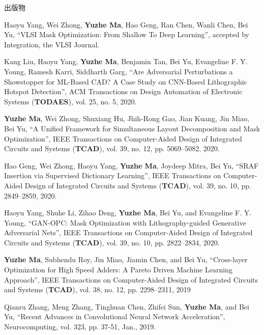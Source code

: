 \begin{rSection}{出版物}
\begin{description}[font=\normalfont]
\item[{[J9]}]{
    Haoyu Yang, Wei Zhong, \textbf{Yuzhe Ma}, Hao Geng, Ran Chen, Wanli Chen, Bei Yu,
    ``VLSI Mask Optimization: From Shallow To Deep Learning'',
    accepted by Integration, the VLSI Journal.
}

\item[{[J8]}]{
    Kang Liu, Haoyu Yang, \textbf{Yuzhe Ma}, Benjamin Tan, Bei Yu, Evangeline F. Y. Young, Ramesh Karri, Siddharth Garg,
    ``Are Adversarial Perturbations a Showstopper for ML-Based CAD? A Case Study on CNN-Based Lithographic Hotspot Detection'',
    ACM Transactions on Design Automation of Electronic Systems (\textbf{TODAES}), vol. 25, no. 5, 2020.
}


\item[{[J7]}]{
    \textbf{Yuzhe Ma}, Wei Zhong, Shuxiang Hu, Jhih-Rong Gao, Jian Kuang, Jin Miao, Bei Yu,
    ``A Unified Framework for Simultaneous Layout Decomposition and Mask Optimization'',
    IEEE Transactions on Computer-Aided Design of Integrated Circuits and Systems (\textbf{TCAD}), vol. 39, no. 12, pp. 5069--5082, 2020.
}

\item[{[J6]}]{
    Hao Geng, Wei Zhong, Haoyu Yang, \textbf{Yuzhe Ma}, Joydeep Mitra, Bei Yu,
    ``SRAF Insertion via Supervised Dictionary Learning'',
    IEEE Transactions on Computer-Aided Design of Integrated Circuits and Systems (\textbf{TCAD}), vol. 39, no. 10, pp. 2849--2859, 2020.
}

\item[{[J5]}]{
    Haoyu Yang, Shuhe Li, Zihao Deng, \textbf{Yuzhe Ma}, Bei Yu, and Evangeline F. Y. Young,
    ``GAN-OPC: Mask Optimization with Lithography-guided Generative Adversarial Nets'',
    IEEE Transactions on Computer-Aided Design of Integrated Circuits and Systems (\textbf{TCAD}), vol. 39, no. 10, pp. 2822--2834, 2020.
}

\item[{[J4]}]{
    \textbf{Yuzhe Ma}, Subhendu Roy, Jin Miao, Jiamin Chen, and Bei Yu,
    ``Cross-layer Optimization for High Speed Adders: A Pareto Driven Machine Learning Approach'',
    IEEE Transactions on Computer-Aided Design of Integrated Circuits and Systems (\textbf{TCAD}), vol. 38, no. 12, pp. 2298--2311, 2019
}

\item[{[J3]}]{
    Qianru Zhang, Meng Zhang, Tinghuan Chen, Zhifei Sun, \textbf{Yuzhe Ma}, and Bei Yu,
    ``Recent Advances in Convolutional Neural Network Acceleration'',
    Neurocomputing, vol. 323, pp. 37-51, Jan., 2019.
}


\end{description}
\end{rSection}
